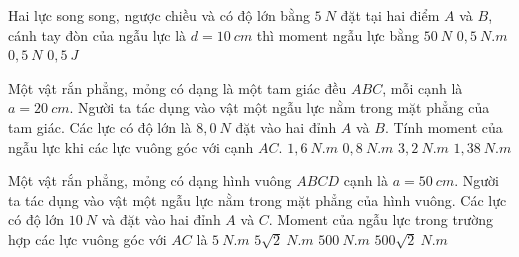 \begin{vidu}%
Hai lực song song, ngược chiều và có độ lớn bằng $5\ N$ đặt tại hai điểm $A$ và $B$, cánh tay đòn của ngẫu lực là $d = 10\ cm$ thì moment ngẫu lực bằng
\choice
{$50\ N$}
{\True $0,5\ N.m$}
{$0,5\ N$}
{$0,5\ J$}
	
\end{vidu}
\begin{vidu}%
Một vật rắn phẳng, mỏng có dạng là một tam giác đều $ABC$, mỗi cạnh là $a = 20\ cm$. Người ta tác dụng vào vật một ngẫu lực nằm trong mặt phẳng của tam giác. Các lực có độ lớn là $8,0\ N$ đặt vào hai đỉnh $A$ và $B$. Tính moment của ngẫu lực khi các lực vuông góc với cạnh $AC$.
\choice
{$1,6\ N.m$}
{\True $0,8\ N.m$}
{$3,2\ N.m$}
{$1,38\ N.m$}
\end{vidu}
\begin{vidu}%
Một vật rắn phẳng, mỏng có dạng hình vuông $ABCD$ cạnh là $a = 50\ cm$. Người ta tác dụng vào vật một ngẫu lực nằm trong mặt phẳng của hình vuông. Các lực có độ lớn $10\ N$ và đặt vào hai đỉnh $A$ và $C$. Moment của ngẫu lực trong trường hợp các lực vuông góc với $AC$ là
\choice
{$5\ N.m$}
{\True $5\sqrt 2\ N.m$}
{$500\ N.m$}
{$500\sqrt 2\ N.m$}
	
\end{vidu}